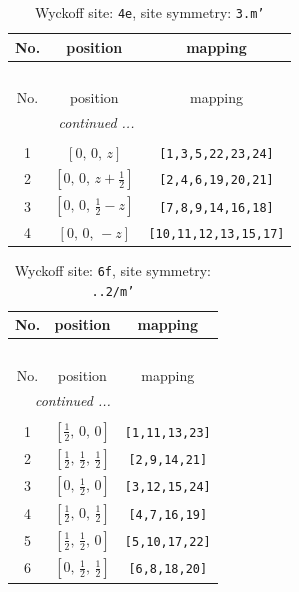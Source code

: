 \documentclass[fleqn,8pt]{jsarticle}
\begin{document}
\renewcommand{\arraystretch}{1.2}
\begin{longtable}{ccc}
\caption{Wyckoff site: {\tt 4e}, site symmetry: {\tt 3.m'}}
 \\
 \hline \hline
No. & position & mapping \\ \hline \endfirsthead

\multicolumn{2}{l}{\tablename\ \thetable{}} \\
 \hline \hline
No. & position & mapping \\ \hline \endhead

 \hline \hline
\multicolumn{2}{r}{\footnotesize\it continued ...} \\ \endfoot

 \hline \hline
\multicolumn{2}{r}{} \\ \endlastfoot

1 & $\left[ 0,\, 0,\, z \right]$ & {\tt [1,3,5,22,23,24]} \\ \hline
2 & $\left[ 0,\, 0,\, z + \frac{1}{2} \right]$ & {\tt [2,4,6,19,20,21]} \\ \hline
3 & $\left[ 0,\, 0,\, \frac{1}{2} - z \right]$ & {\tt [7,8,9,14,16,18]} \\ \hline
4 & $\left[ 0,\, 0,\, - z \right]$ & {\tt [10,11,12,13,15,17]} \\
\end{longtable}
\renewcommand{\arraystretch}{1.2}
\begin{longtable}{ccc}
\caption{Wyckoff site: {\tt 6f}, site symmetry: {\tt ..2/m'}}
 \\
 \hline \hline
No. & position & mapping \\ \hline \endfirsthead

\multicolumn{2}{l}{\tablename\ \thetable{}} \\
 \hline \hline
No. & position & mapping \\ \hline \endhead

 \hline \hline
\multicolumn{2}{r}{\footnotesize\it continued ...} \\ \endfoot

 \hline \hline
\multicolumn{2}{r}{} \\ \endlastfoot

1 & $\left[ \frac{1}{2},\, 0,\, 0 \right]$ & {\tt [1,11,13,23]} \\ \hline
2 & $\left[ \frac{1}{2},\, \frac{1}{2},\, \frac{1}{2} \right]$ & {\tt [2,9,14,21]} \\ \hline
3 & $\left[ 0,\, \frac{1}{2},\, 0 \right]$ & {\tt [3,12,15,24]} \\ \hline
4 & $\left[ \frac{1}{2},\, 0,\, \frac{1}{2} \right]$ & {\tt [4,7,16,19]} \\ \hline
5 & $\left[ \frac{1}{2},\, \frac{1}{2},\, 0 \right]$ & {\tt [5,10,17,22]} \\ \hline
6 & $\left[ 0,\, \frac{1}{2},\, \frac{1}{2} \right]$ & {\tt [6,8,18,20]} \\
\end{longtable}
\end{document}
